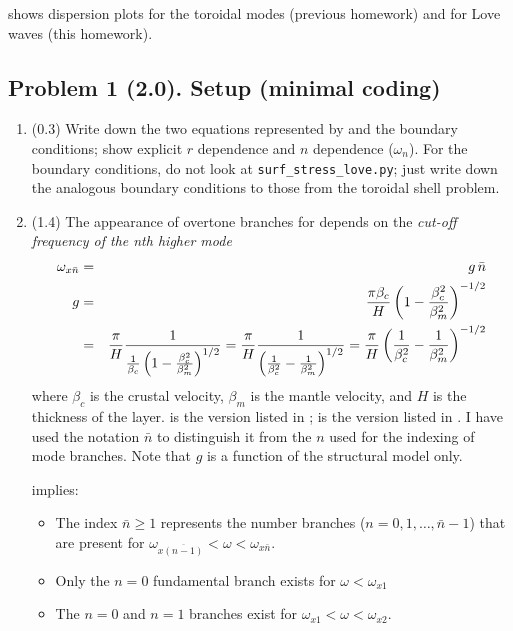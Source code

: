 \documentclass[11pt,titlepage,fleqn]{article}
\newcommand{\tfilessB}{{\tt surf\_stress\_love.py}}
\begin{document}
 shows dispersion plots for the toroidal modes (previous homework) and for Love waves (this homework).


\subsection*{Problem 1 (2.0). Setup (minimal coding)}

\begin{enumerate}

\item (0.3) Write down the two equations represented by  and the boundary conditions; show explicit $r$ dependence and $n$ dependence (\eg $\omega_n$). For the boundary conditions, do not look at \tfilessB; just write down the analogous boundary conditions to those from the toroidal shell problem.


\item (1.4) The appearance of overtone branches for  depends on the {\em cut-off frequency of the nth higher mode} 
%
\begin{eqnarray}
{\omega}_{x\bar{n}} &=& g\,\bar{n}
\label{wcn}
\\
g &=& \frac{\pi\beta_c}{H} \left( 1 - \frac{\beta_c^2}{\beta_m^2}\right)^{-1/2}
\label{wcn_Aki}
\\
&=& \frac{\pi}{H} \frac{1}{\frac{1}{\beta_c}\left(1 - \frac{\beta_c^2}{\beta_m^2} \right)^{1/2}}
= \frac{\pi}{H} \frac{1}{\left(\frac{1}{\beta_c^2} - \frac{1}{\beta_m^2} \right)^{1/2}}
= \frac{\pi}{H} \left( \frac{1}{\beta_c^2} - \frac{1}{\beta_m^2} \right)^{-1/2}
\label{wcn_SW}
\end{eqnarray}
%
where $\beta_c$ is the crustal velocity, $\beta_m$ is the mantle velocity, and $H$ is the thickness of the layer.  is the version listed in \citet[][Eq. 7.8]{AkiRichardsE2};  is the version listed in  \citet[][p. 92]{SteinWysession}. I have used the notation $\bar{n}$ to distinguish it from the $n$ used for the indexing of mode branches. Note that $g$ is a function of the structural model only.

\pagebreak
{} implies:
%
\begin{itemize}
\item The index $\bar{n} \ge 1$ represents the number branches ($n = 0, 1, \ldots, \bar{n}-1$) that are present for $\omega_{x\overline{(n-1)}} < \omega < \omega_{x\bar{n}}$.
\item Only the $n=0$ fundamental branch exists for $\omega < \omega_{x1}$
\item The $n=0$ and $n=1$ branches exist for $\omega_{x1} < \omega < \omega_{x2}$.
\end{itemize}
%


\end{enumerate}
\end{document}
